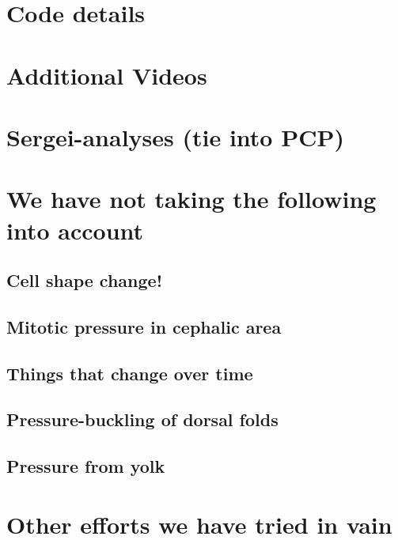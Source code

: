 \chapter*{Code details}
\label{App:Code}
\chapter*{Additional Videos}
\label{App:videos}
\chapter*{Sergei-analyses (tie into PCP)}
\label{App:Sergei}
\chapter*{We have not taking the following into account}
\section*{Cell shape change!}
\section*{Mitotic pressure in cephalic area}
\section*{Things that change over time}
\section*{Pressure-buckling of dorsal folds}
\section*{Pressure from yolk}
\chapter*{Other efforts we have tried in vain}

